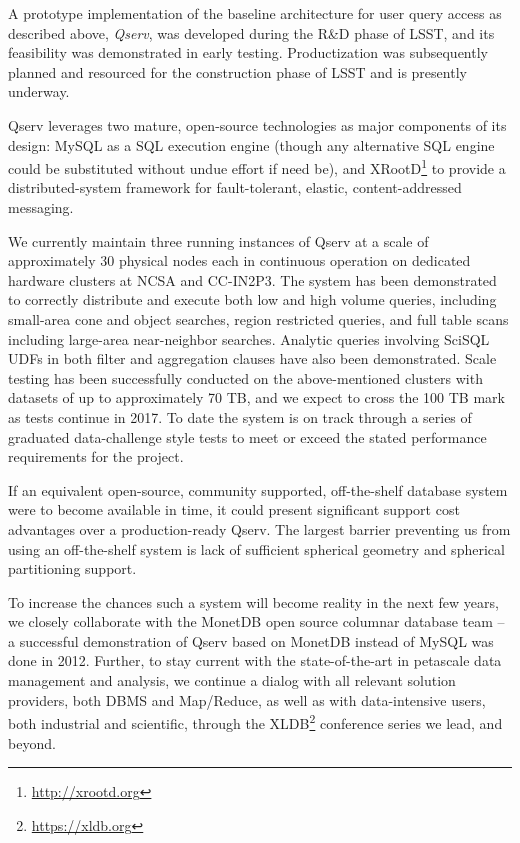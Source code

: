 \documentclass[DM,lsstdraft,toc]{lsstdoc}
\begin{document}
A prototype implementation of the baseline architecture for user query access
as described above, \emph{Qserv}, was developed during the R&D phase of LSST,
and its feasibility was demonstrated in early testing.  Productization was
subsequently planned and resourced for the construction phase of LSST and is
presently underway.

Qserv leverages two mature, open-source technologies as major components of
its design: MySQL as a SQL execution engine (though any alternative SQL engine
could be substituted without undue effort if need be), and
XRootD\footnote{\url{http://xrootd.org}} \citep{Dorigo:2005:XRootd} to provide
a distributed-system framework for fault-tolerant, elastic, content-addressed
messaging.

We currently maintain three running instances of Qserv at a scale of
approximately 30 physical nodes each in continuous operation on dedicated
hardware clusters at NCSA and CC-IN2P3. The system has been demonstrated to
correctly distribute and execute both low and high volume queries, including
small-area cone and object searches, region restricted queries, and full table
scans including large-area near-neighbor searches. Analytic queries involving
SciSQL UDFs in both filter and aggregation clauses have also been
demonstrated. Scale testing has been successfully conducted on the
above-mentioned clusters with datasets of up to approximately 70 TB, and we
expect to cross the 100 TB mark as tests continue in 2017. To date the system
is on track through a series of graduated data-challenge style tests to meet
or exceed the stated performance requirements for the project.

If an equivalent open-source, community supported, off-the-shelf database
system were to become available in time, it could present significant support
cost advantages over a production-ready Qserv. The largest barrier preventing
us from using an off-the-shelf system is lack of sufficient spherical geometry
and spherical partitioning support.

To increase the chances such a system will become reality in the next
few years, we closely collaborate with the MonetDB open
source columnar database team -- a successful demonstration of Qserv
based on MonetDB instead of MySQL was done in 2012. Further, to stay
current with the state-of-the-art in petascale data management and
analysis, we continue a dialog with all relevant solution providers,
both DBMS and Map/Reduce, as well as with data-intensive users, both
industrial and scientific, through the XLDB\footnote{\url{https://xldb.org}}
conference series we lead, and beyond.
\end{document}
